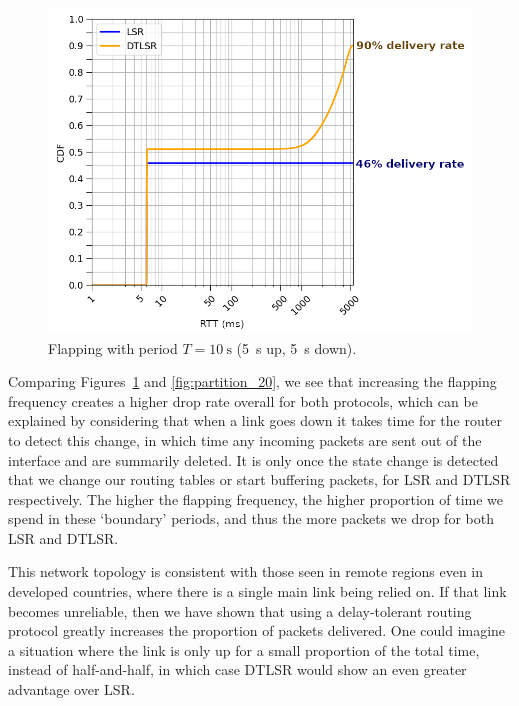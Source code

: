 \documentclass[withindex,glossary,openany]{cam-thesis}
\begin{document}
\begin{figure}
  \centering
  \hspace*{2.4cm}
  \includegraphics[width=0.8\linewidth]{delay_partition_flap5}
  \caption{Flapping with period $T=\SI{10}{\s}$ (\SI{5}{\s} up, \SI{5}{\s} down).}
  \label{fig:partition_5}
\end{figure}

Comparing Figures~\ref{fig:partition_5} and \ref{fig:partition_20}, we see that increasing the flapping frequency creates a higher drop rate overall for both protocols, which can be explained by considering that when a link goes down it takes time for the router to detect this change, in which time any incoming packets are sent out of the interface and are summarily deleted. It is only once the state change is detected that we change our routing tables or start buffering packets, for LSR and DTLSR respectively. The higher the flapping frequency, the higher proportion of time we spend in these `boundary' periods, and thus the more packets we drop for both LSR and DTLSR.

This network topology is consistent with those seen in remote regions even in developed countries, where there is a single main link being relied on. If that link becomes unreliable, then we have shown that using a delay-tolerant routing protocol greatly increases the proportion of packets delivered. One could imagine a situation where the link is only up for a small proportion of the total time, instead of half-and-half, in which case DTLSR would show an even greater advantage over LSR.
\end{document}
